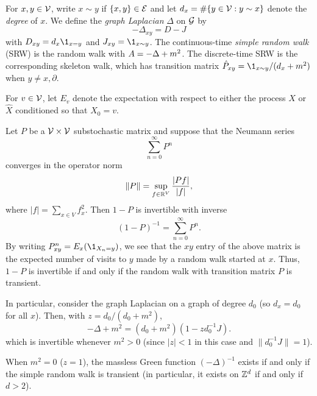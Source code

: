 \begin{example}
For $x, y \in \mathcal{V}$, write $x \sim y$ if $\{ x, y \} \in \mathcal{E}$ and let
$d_x = \#\{y \in \mathcal{V} : y \sim x \}$ denote the \emph{degree} of $x$. We define the
\emph{graph Laplacian} $\Delta$ on $\mathcal{G}$ by
\begin{equation}
-\Delta_{xy} = D - J
\end{equation}
with $D_{xy} = d_x \1_{x=y}$ and $J_{xy} = \1_{x \sim y}$.
The continuous-time \emph{simple random walk} (SRW) is the random walk with $A = -\Delta + m^2$.
The discrete-time SRW is the corresponding skeleton walk, which has transition matrix
$\hat P_{xy} = \1_{x \sim y} / (d_x + m^2)$ when $y \ne x, \partial$.
\end{example}

For $v \in \mathcal{V}$, let $E_v$ denote the expectation
with respect to either the process $X$ or $\hat X$ conditioned so that $X_0 = v$.

\begin{example}
Let $P$ be a $\mathcal{V} \times \mathcal{V}$ substochastic matrix and suppose that the Neumann series
\begin{equation}
\sum_{n=0}^\infty P^n
\end{equation}
converges in the operator norm
\begin{equation}
\|P\| = \sup_{f \in {\mathbb R}^V} \frac{|P f|}{|f|},
\end{equation}
where $|f| = \sum_{x\in V} f_x^2$. Then $1 - P$ is invertible with inverse
\begin{equation}
(1 - P)^{-1} = \sum_{n=0}^\infty P^n.
\end{equation}
By writing $P^n_{xy} = E_x( \1_{X_n=y})$, we see that the $xy$ entry of the
above matrix is the expected number of visits to $y$ made by a random walk
started at $x$. Thus, $1 - P$ is invertible if and only if the random walk
with transition matrix $P$ is transient. 

In particular, consider the graph Laplacian on a graph of degree $d_0$
(so $d_x = d_0$ for all $x$).
Then, with  $z = d_0 / (d_0 + m^2)$,
\begin{equation}
-\Delta + m^2 = (d_0 + m^2) (1 - z d_0^{-1} J).
\end{equation}
which is invertible whenever $m^2 > 0$ (since $|z| < 1$ in this case and $\|d_0^{-1} J\| = 1$).

When $m^2 = 0$ ($z = 1$), the massless Green function $(-\Delta)^{-1}$
exists if and only if the simple random walk is transient (in particular, it exists on
${ {{\mathbb Z}}^d }$ if and only if $d > 2$).
\end{example}

